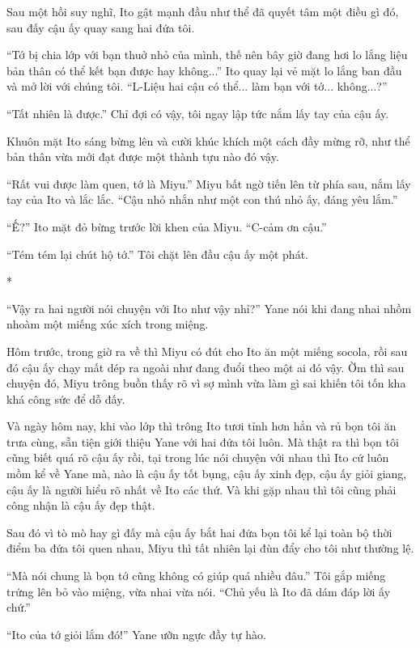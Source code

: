 {Sau một hồi suy nghĩ, Ito gật mạnh đầu như thể đã quyết tâm một điều gì
đó, sau đấy cậu ấy quay sang hai đứa tôi.

``Tớ bị chia lớp với bạn thuở nhỏ của mình, thế nên bây giờ đang hơi lo
lắng liệu bản thân có thể kết bạn được hay không...'' Ito quay lại vẻ
mặt lo lắng ban đầu và mở lời với chúng tôi. ``L-Liệu hai cậu có thể...
làm bạn với tớ... không...?''

``Tất nhiên là được.'' Chỉ đợi có vậy, tôi ngay lập tức nắm lấy tay của
cậu ấy.

Khuôn mặt Ito sáng bừng lên và cười khúc khích một cách đầy mừng rỡ, như
thể bản thân vừa mới đạt được một thành tựu nào đó vậy.

``Rất vui được làm quen, tớ là Miyu.'' Miyu bất ngờ tiến lên từ phía
sau, nắm lấy tay của Ito và lắc lắc. ``Cậu nhỏ nhắn như một con thú nhỏ
ấy, đáng yêu lắm.''

``Ế?'' Ito mặt đỏ bừng trước lời khen của Miyu. ``C-cảm ơn cậu.''

``Tém tém lại chút hộ tớ.'' Tôi chặt lên đầu cậu ấy một phát.

*

``Vậy ra hai người nói chuyện với Ito như vậy nhỉ?'' Yane nói khi đang
nhai nhồm nhoàm một miếng xúc xích trong miệng.

Hôm trước, trong giờ ra về thì Miyu có đút cho Ito ăn một miếng socola,
rồi sau đó cậu ấy chạy mất dép ra ngoài như đang đuổi theo một ai đó
vậy. Ờm thì sau chuyện đó, Miyu trông buồn thấy rõ vì sợ mình vừa làm gì
sai khiến tôi tốn kha khá công sức để dỗ đấy.

Và ngày hôm nay, khi vào lớp thì trông Ito tươi tỉnh hơn hẳn và rủ bọn
tôi ăn trưa cùng, sẵn tiện giới thiệu Yane với hai đứa tôi luôn. Mà thật
ra thì bọn tôi cũng biết quá rõ cậu ấy rồi, tại trong lúc nói chuyện với
nhau thì Ito cứ luôn mồm kể về Yane mà, nào là cậu ấy tốt bụng, cậu ấy
xinh đẹp, cậu ấy giỏi giang, cậu ấy là người hiểu rõ nhất về Ito các
thứ. Và khi gặp nhau thì tôi cũng phải công nhận là cậu ấy đẹp thật.

Sau đó vì tò mò hay gì đấy mà cậu ấy bắt hai đứa bọn tôi kể lại toàn bộ
thời điểm ba đứa tôi quen nhau, Miyu thì tất nhiên lại đùn đẩy cho tôi
như thường lệ.

``Mà nói chung là bọn tớ cũng không có giúp quá nhiều đâu.'' Tôi gắp
miếng trứng lên bỏ vào miệng, vừa nhai vừa nói. ``Chủ yếu là Ito đã dám
đáp lời ấy chứ.''

``Ito của tớ giỏi lắm đó!'' Yane ưỡn ngực đầy tự hào.

}

